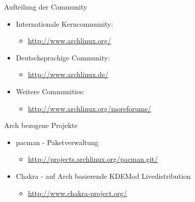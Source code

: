 

\begin{slide}{Aufteilung der Community}
	\begin{itemize}
		\item{Internationale Kerncommunity:
			\begin{itemize}
				\item{\url{http://www.archlinux.org/}}
			\end{itemize}
		}
		\item{Deutschsprachige Community:
			\begin{itemize}
				\item{\url{http://www.archlinux.de/}}
			\end{itemize}
		}
		\item{Weitere Communities:
			\begin{itemize}
				\item{\url{http://www.archlinux.org/moreforums/}}
			\end{itemize}
		}
	\end{itemize}
\end{slide}

\begin{slide}{Arch bezogene Projekte}
	\begin{itemize}
		\item{pacman - Paketverwaltung
			\begin{itemize}
				\item{\url{http://projects.archlinux.org/pacman.git/}}
			\end{itemize}
		}
		\item{Chakra - auf Arch basierende KDEMod Livedistribution
			\begin{itemize}
				\item{\url{http://www.chakra-project.org/}}
			\end{itemize}
		}
	\end{itemize}
\end{slide}

